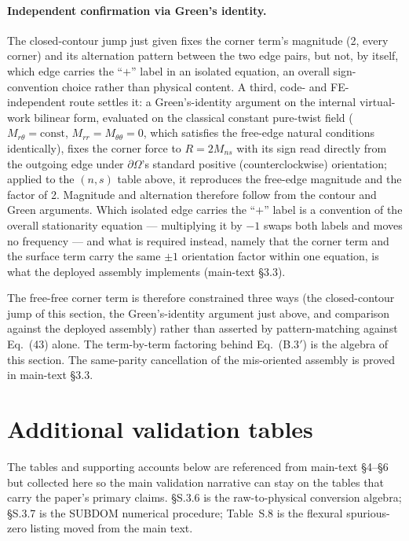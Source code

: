 \documentclass[11pt]{article}
\begin{document}
\paragraph{Independent confirmation via Green's identity.} The
closed-contour jump just given fixes the corner term's magnitude (2, every
corner) and its alternation pattern between the two edge pairs, but not,
by itself, which edge carries the ``$+$'' label in an isolated equation,
an overall sign-convention choice rather than physical content. A third,
code- and FE-independent route settles it: a Green's-identity argument on
the internal virtual-work bilinear form, evaluated on the classical
constant pure-twist field ($M_{r\theta}=\text{const}$,
$M_{rr}=M_{\theta\theta}=0$, which satisfies the free-edge natural
conditions identically), fixes the corner force to $R=2M_{ns}$ with its
sign read directly from the outgoing edge under $\partial\Omega$'s
standard positive (counterclockwise) orientation; applied to the $(n,s)$
table above, it reproduces the free-edge magnitude and the
factor of 2. Magnitude and alternation therefore follow from the contour
and Green arguments. Which isolated edge carries the ``$+$'' label is a
convention of the overall stationarity equation --- multiplying it by $-1$
swaps both labels and moves no frequency --- and what is required instead,
namely that the corner term and the surface term carry the same $\pm1$
orientation factor within one equation, is what the deployed assembly
implements (main-text \S3.3).

The free-free corner term is therefore constrained three ways (the
closed-contour jump of this section, the Green's-identity argument
just above, and comparison against the deployed assembly) rather than
asserted by pattern-matching against Eq.~(43) alone. The term-by-term
factoring behind Eq.~(B.3$'$) is the algebra of this section. The
same-parity cancellation of the mis-oriented assembly is proved in
main-text \S3.3.

\section{Additional validation tables}\label{sec:extra-tables}
The tables and supporting accounts below are referenced from
main-text \S4--\S6 but collected here so the main validation narrative
can stay on the tables that carry the paper's primary claims.
§S.3.6 is the raw-to-physical conversion algebra; §S.3.7 is the SUBDOM
numerical procedure; Table~S.8 is the
flexural spurious-zero listing moved from the main text.
\end{document}
